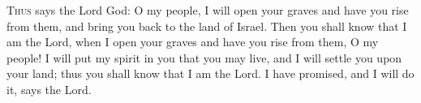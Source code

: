 
\lettrine{T}{hus} says the Lord God: O my people, I will open your graves and have you rise from them, and bring you back to the land of Israel. Then you shall know that I am the Lord, when I open your graves and have you rise from them, O my people! I will put my spirit in you that you may live, and I will settle you upon your land; thus you shall know that I am the Lord. I have promised, and I will do it, says the Lord.